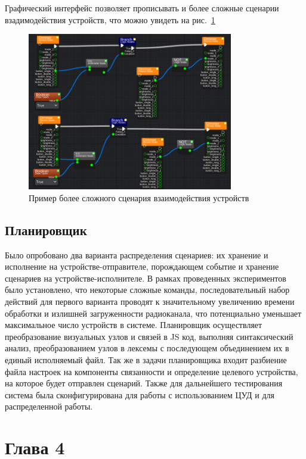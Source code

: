 \documentclass[a4paper,12pt]{article}
\begin{document}
Графический интерфейс позволяет прописывать и более сложные сценарии взадимодействия устройств, что можно увидеть на рис.~\ref{fig:GUI_adv}

\begin{figure}[H]
    \centering
    \includegraphics[width=0.8\textwidth]{images/Fig12.png}
    \caption{Пример более сложного сценария взаимодействия устройств}
    \label{fig:GUI_adv}
\end{figure}

\subsection{Планировщик}
Было опробовано два варианта распределения сценариев: их хранение и исполнение на устройстве-отправителе, порождающем событие и хранение сценариев на устройстве-исполнителе. В рамках проведенных экспериментов было установлено, что некоторые сложные команды, последовательный набор действий для первого варианта проводят к значительному увеличению времени обработки и излишней загруженности радиоканала, что потенциально уменьшает максимальное число устройств в системе.
Планировщик осуществляет преобразование визуальных узлов и связей в JS код, выполняя синтаксический анализ, преобразованием узлов в лексемы с последующем объединением их в единый исполняемый файл. Так же в задачи планировщика входит разбиение файла настроек на компоненты связанности и определение целевого устройства, на которое будет отправлен сценарий.
Также для дальнейшего тестирования система была сконфигурирована для работы с использованием ЦУД и для распределенной работы.

\newpage

\section{Глава 4}
\end{document}
